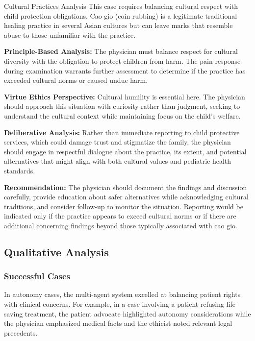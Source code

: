 \documentclass[11pt]{article}
\begin{document}
\begin{analysisbox}{Cultural Practices Analysis}
This case requires balancing cultural respect with child protection obligations. Cao gio (coin rubbing) is a legitimate traditional healing practice in several Asian cultures but can leave marks that resemble abuse to those unfamiliar with the practice.

\textbf{Principle-Based Analysis:} The physician must balance respect for cultural diversity with the obligation to protect children from harm. The pain response during examination warrants further assessment to determine if the practice has exceeded cultural norms or caused undue harm.

\textbf{Virtue Ethics Perspective:} Cultural humility is essential here. The physician should approach this situation with curiosity rather than judgment, seeking to understand the cultural context while maintaining focus on the child's welfare.

\textbf{Deliberative Analysis:} Rather than immediate reporting to child protective services, which could damage trust and stigmatize the family, the physician should engage in respectful dialogue about the practice, its extent, and potential alternatives that might align with both cultural values and pediatric health standards.

\textbf{Recommendation:} The physician should document the findings and discussion carefully, provide education about safer alternatives while acknowledging cultural traditions, and consider follow-up to monitor the situation. Reporting would be indicated only if the practice appears to exceed cultural norms or if there are additional concerning findings beyond those typically associated with cao gio.
\end{analysisbox}

\subsection{Qualitative Analysis}

\subsubsection{Successful Cases}

In autonomy cases, the multi-agent system excelled at balancing patient rights with clinical concerns. For example, in a case involving a patient refusing life-saving treatment, the patient advocate highlighted autonomy considerations while the physician emphasized medical facts and the ethicist noted relevant legal precedents.
\end{document}
